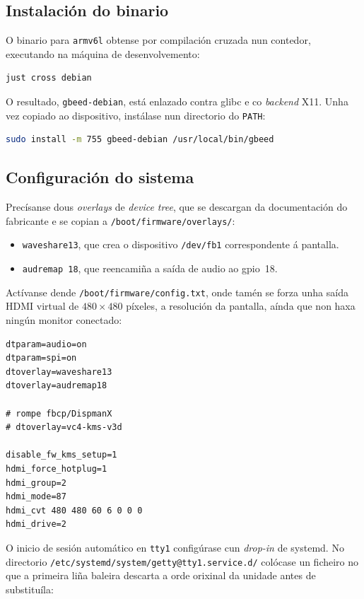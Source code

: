 \subsection{Instalación do binario}

O binario para \texttt{armv6l} obtense por compilación cruzada nun contedor, executando na máquina
de desenvolvemento:

\begin{lstlisting}[language=bash]
just cross debian
\end{lstlisting}

O resultado, \texttt{gbeed-debian}, está enlazado contra glibc e co \textit{backend} X11. Unha vez
copiado ao dispositivo, instálase nun directorio do \texttt{PATH}:

\begin{lstlisting}[language=bash]
sudo install -m 755 gbeed-debian /usr/local/bin/gbeed
\end{lstlisting}

\subsection{Configuración do sistema}

Precísanse dous \textit{overlays} de \textit{device tree}, que se descargan da documentación do fabricante
e se copian a \texttt{/boot/firmware/overlays/}:

\begin{itemize}
    \item \texttt{waveshare13}, que crea o dispositivo \texttt{/dev/fb1} correspondente á pantalla.
    \item \texttt{audremap
    18}, que reencamiña a saída de audio ao \acrshort{gpio}~18.
\end{itemize}

Actívanse dende \texttt{/boot/firmware/config.txt}, onde tamén se forza unha saída HDMI virtual de
$480\times480$ píxeles, a resolución da pantalla, aínda que non haxa ningún monitor conectado:

\begin{lstlisting}
dtparam=audio=on
dtparam=spi=on
dtoverlay=waveshare13
dtoverlay=audremap18

# rompe fbcp/DispmanX
# dtoverlay=vc4-kms-v3d

disable_fw_kms_setup=1
hdmi_force_hotplug=1
hdmi_group=2
hdmi_mode=87
hdmi_cvt 480 480 60 6 0 0 0
hdmi_drive=2
\end{lstlisting}


O inicio de sesión automático en \texttt{tty1} configúrase cun \textit{drop-in} de systemd. No directorio
\texttt{/etc/systemd/system/getty@tty1.service.d/} colócase un ficheiro no que a primeira liña
baleira descarta a orde orixinal da unidade antes de substituíla:

